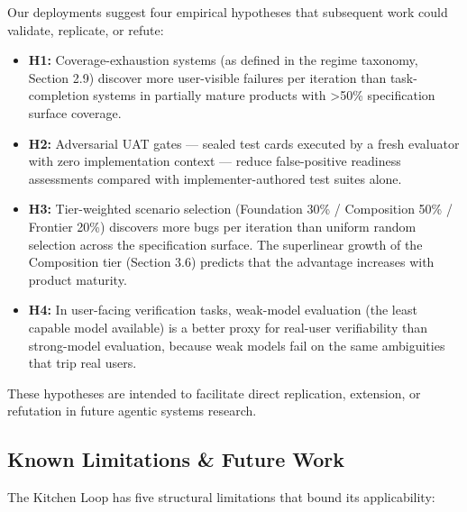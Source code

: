 \documentclass[11pt,a4paper]{article}
\begin{document}
Our deployments suggest four empirical hypotheses that subsequent work could validate, replicate, or refute:

\begin{itemize}
\item
  \textbf{H1:} Coverage-exhaustion systems (as defined in the regime taxonomy, Section 2.9) discover more user-visible failures per iteration than task-completion systems in partially mature products with \textgreater50\% specification surface coverage.
\item
  \textbf{H2:} Adversarial UAT gates --- sealed test cards executed by a fresh evaluator with zero implementation context --- reduce false-positive readiness assessments compared with implementer-authored test suites alone.
\item
  \textbf{H3:} Tier-weighted scenario selection (Foundation 30\% / Composition 50\% / Frontier 20\%) discovers more bugs per iteration than uniform random selection across the specification surface. The superlinear growth of the Composition tier (Section 3.6) predicts that the advantage increases with product maturity.
\item
  \textbf{H4:} In user-facing verification tasks, weak-model evaluation (the least capable model available) is a better proxy for real-user verifiability than strong-model evaluation, because weak models fail on the same ambiguities that trip real users.
\end{itemize}

These hypotheses are intended to facilitate direct replication, extension, or refutation in future agentic systems research.

\subsection{Known Limitations \& Future Work}\label{sec:known-limitations-future-work}

The Kitchen Loop has five structural limitations that bound its applicability:
\end{document}
